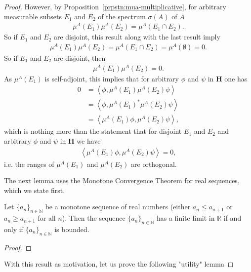 \begin{proof}
However, by Proposition~\ref{prpstn:mua-multiplicative}, for arbitrary measurable subsets $E_1$ and $E_2$ of the spectrum $\sigma(A)$ of $A$
\begin{align}
    \mu^A(E_1) \mu^A(E_2) = \mu^A(E_1 \cap E_2).
\end{align}
So if $E_1$ and $E_2$ are disjoint, this result along with the last result imply
\begin{align}
    \mu^A(E_1) \mu^A(E_2) = \mu^A(E_1 \cap E_2) = \mu^A(\emptyset) = 0.
\end{align}
So if $E_1$ and $E_2$ are disjoint, then
\begin{align}
    \mu^A(E_1) \mu^A(E_2) = 0.
\end{align}
As $\mu^A(E_1)$ is self-adjoint, this implies that for arbitrary $\phi$ and $\psi$ in $\mathbf{H}$ one has
\begin{align}
    0 &= \left< \phi, \mu^A(E_1) \mu^A(E_2)\psi \right> \\
      &= \left< \phi, \mu^A(E_1)^* \mu^A(E_2)\psi \right> \\
      &= \left< \mu^A(E_1)\phi, \mu^A(E_2)\psi \right>,
\end{align}
which is nothing more than the statement that for disjoint $E_1$ and $E_2$ and arbitrary $\phi$ and $\psi$ in $\mathbf{H}$ we have
\begin{align}
    \left< \mu^A(E_1)\phi, \mu^A(E_2)\psi \right> = 0,
\end{align}
i.e. the ranges of $\mu^A(E_1)$ and $\mu^A(E_2)$ are orthogonal.

The next lemma uses the Monotone Convergence Theorem for real sequences, which we state first.

\begin{theorem}
    \label{thrm:monotone-convergence-theorem}
    \leanok
    Let $\{ a_n \}_{n \in \mathbb{N}}$ be a monotone sequence of real numbers (either $a_n \le a_{n+1}$ or $a_n \ge a_{n+1}$ for all $n$). Then the sequence $\{ a_n \}_{n \in \mathbb{N}}$ has a finite limit in $\mathbb{R}$ if and only if $\{ a_n \}_{n \in \mathbb{N}}$ is bounded.
\end{theorem}
\begin{proof}
\leanok
\end{proof}

With this result as motivation, let us prove the following "utility" lemma


\end{proof}
